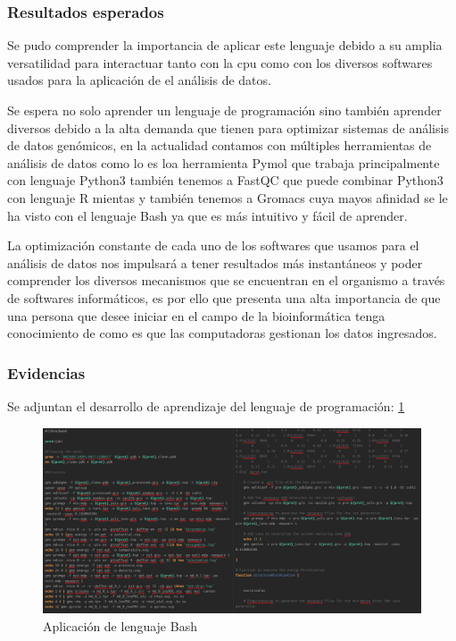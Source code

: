 \documentclass[a4paper,12pt]{article}
\begin{document}
        \subsubsection{Resultados esperados}
        Se pudo comprender la importancia de aplicar este lenguaje debido a su amplia versatilidad para interactuar tanto con la cpu como con los diversos softwares usados para la aplicación de el análisis de datos.

        Se espera no solo aprender un lenguaje de programación sino también aprender diversos debido a la alta demanda que tienen para optimizar sistemas de análisis de datos genómicos, en la actualidad contamos con múltiples herramientas de análisis de datos como lo es loa herramienta Pymol que trabaja principalmente con lenguaje Python3 también tenemos a FastQC que puede combinar Python3 con lenguaje R mientas y también tenemos a Gromacs cuya mayos afinidad se le ha visto con el lenguaje Bash ya que es más intuitivo y fácil de aprender. 

        La optimización constante de cada uno de los softwares que usamos para el análisis de datos nos impulsará a tener resultados más instantáneos y poder comprender los diversos mecanismos que se encuentran en el organismo a través de softwares informáticos, es por ello que presenta una alta importancia de que una persona que desee iniciar en el campo de la bioinformática tenga conocimiento de como es que las computadoras gestionan los datos ingresados. 

        \subsubsection{Evidencias}
        Se adjuntan el desarrollo de aprendizaje del lenguaje de programación: \ref{BashScript}

        \begin{figure}[H]
            \centering
            \includegraphics[width=14cm]{img/scrip.png}
            \caption{Aplicación de lenguaje Bash}
            \label{BashScript}
        \end{figure}
        
\end{document}
